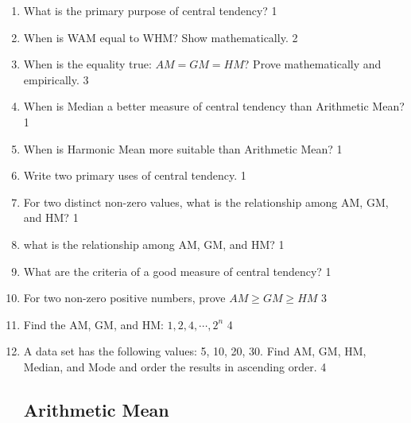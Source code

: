 \documentclass[a4paper,oneside]{book}
\begin{document}
\begin{enumerate}

\subsection{General Questions}

    \item What is the primary purpose of central tendency? \hfill 1
    \item When is WAM equal to WHM? Show mathematically. \hfill 2
    \item When is the equality true: $AM=GM=HM$? Prove mathematically and empirically.  \hfill 3
    \item When is Median a better measure of central tendency than Arithmetic Mean?  \hfill 1
    \item When is Harmonic Mean more suitable than Arithmetic Mean?  \hfill 1
    \item Write two primary uses of central tendency. \hfill 1
    \item For two distinct non-zero values, what is the relationship among AM, GM, and HM? \hfill 1
    \item what is the relationship among AM, GM, and HM? \hfill 1
    \item What are the criteria of a good measure of central tendency? \hfill 1
    \item For two non-zero positive numbers, prove $AM \ge GM \ge HM$ \hfill 3
    \item Find the AM, GM, and HM: $1,2,4,\cdots, 2^n$ \hfill 4
    \item A data set has the following values: 5, 10, 20, 30. Find AM, GM, HM, Median, and Mode and order the results in ascending order. \hfill 4

    
\subsection{Arithmetic Mean}


\end{enumerate}
\end{document}
